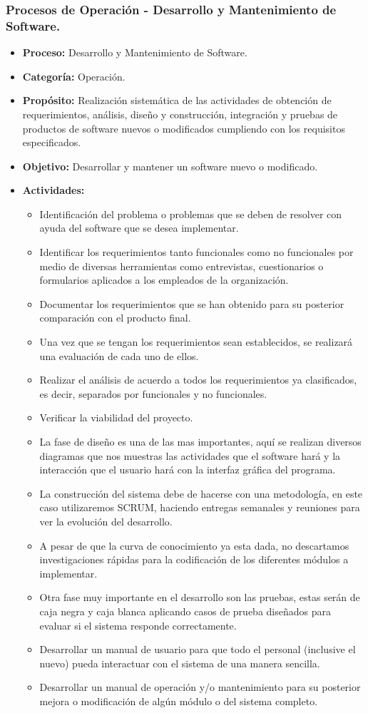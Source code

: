 \subsubsection{Procesos de Operación - Desarrollo y Mantenimiento de Software.}
\begin{itemize}
	\item \textbf{Proceso:} Desarrollo y Mantenimiento de Software.
	\item \textbf{Categoría:} Operación.
	\item \textbf{Propósito:} Realización sistemática de las actividades de obtención de requerimientos, análisis, diseño y construcción, integración y pruebas de productos de software nuevos o modificados cumpliendo con los requisitos especificados.  
	\item \textbf{Objetivo:} Desarrollar y mantener un software nuevo o modificado.
	\item \textbf{Actividades:} 
	\begin{itemize}
		\item Identificación del problema o problemas que se deben de resolver con ayuda del software que se desea implementar.
		\item Identificar los requerimientos tanto funcionales como no funcionales por medio de diversas herramientas como entrevistas, cuestionarios o formularios aplicados a los empleados de la organización.
		\item Documentar los requerimientos que se han obtenido para su posterior comparación con el producto final.
		\item Una vez que se tengan los requerimientos sean establecidos, se realizará una evaluación de cada uno de ellos.
		\item Realizar el análisis de acuerdo a todos los requerimientos ya clasificados, es decir, separados por funcionales y no funcionales.
		\item Verificar la viabilidad del proyecto.
		\item La fase de diseño es una de las mas importantes, aquí se realizan diversos diagramas que nos muestras las actividades que el software hará y la interacción que el usuario hará con la interfaz gráfica del programa.
		\item La construcción del sistema debe de hacerse con una metodología, en este caso utilizaremos SCRUM, haciendo entregas semanales y reuniones para ver la evolución del desarrollo. 
		\item A pesar de que la curva de conocimiento ya esta dada, no descartamos investigaciones rápidas para la codificación de los diferentes módulos a implementar.
		\item Otra fase muy importante en el desarrollo son las pruebas, estas serán de caja negra y caja blanca aplicando casos de prueba diseñados para evaluar si el sistema responde correctamente.
		\item Desarrollar un manual de usuario para que todo el personal (inclusive el nuevo) pueda interactuar con el sistema de una manera sencilla.
		\item Desarrollar un manual de operación y/o mantenimiento para su posterior mejora o modificación de algún módulo o del sistema completo. 
	\end{itemize}
\end{itemize}
